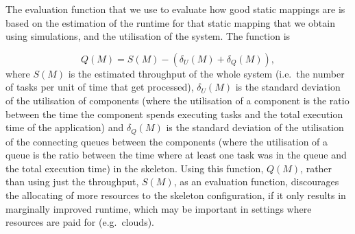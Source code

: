\documentclass[smallextended]{svjour3}
\begin{document}


The evaluation function that we use to evaluate how good static
mappings are is based on the estimation of the runtime for that static
mapping that we obtain using simulations, and the utilisation of the
system. The function is


$$Q(M) = S(M) - (\delta_U(M) + \delta_Q(M)),$$
where $S(M)$ is the estimated throughput of the whole system (i.e.\
the number of tasks per unit of time that get processed),
$\delta_U(M)$ is the standard deviation of the utilisation of
components (where the utilisation of a component is the ratio between the time the component spends
executing tasks and the total execution time of the application) and $\delta_Q(M)$ is the standard deviation of
the utilisation of the connecting queues between the components (where
the utilisation of a queue is the ratio between the time where at least
one task was in the queue and the total execution time) in the skeleton. Using this function, $Q(M)$, rather than using
just the throughput, $S(M)$, as an evaluation function, discourages the allocating of more resources to the skeleton configuration, if
it only results in marginally improved runtime, which may be important
in settings where resources are paid for (e.g.\ clouds).


\end{document}
